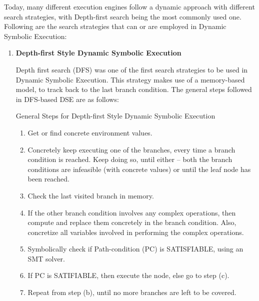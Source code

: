 \documentclass[11pt]{llncs}
\begin{document}
		\vspace{2mm}

		Today, many different execution engines follow a dynamic approach with different search strategies, with Depth-first search being the most commonly used one.\\

		Following are the search strategies that can or are employed in Dynamic Symbolic Execution:
		\begin{enumerate}
			\item \textbf{Depth-first Style Dynamic Symbolic Execution}
    
				Depth first search (DFS) was one of the first search strategies to be used in Dynamic Symbolic Execution. \cite{1_Search_Strategies_DSE} This strategy makes use of a memory-based model, to track back to the last branch condition. The general steps followed in DFS-based DSE are as follows:\\

				\begin{algorithm}[H]
					\caption{General Steps for Depth-first Style Dynamic Symbolic Execution}  \label{algorithm_2}
					
					\DontPrintSemicolon
					\SetAlgoLined
					
					
					\begin{enumerate}
						\item Get or find concrete environment values.
						\item Concretely keep executing one of the branches, every time a branch condition is reached. Keep doing so, until either – both the branch conditions are infeasible (with concrete values) or until the leaf node has been reached.
						\item Check the last visited branch in memory.
						\item If the other branch condition involves any complex operations, then compute and replace them concretely in the branch condition. Also, concretize all variables involved in performing the complex operations.
						\item Symbolically check if Path-condition (PC) is SATISFIABLE, using an SMT solver.
						\item If PC is SATIFIABLE, then execute the node, else go to step (c).
						\item Repeat from step (b), until no more branches are left to be covered.
					\end{enumerate}
				\end{algorithm}
				~


\end{enumerate}
\end{document}
